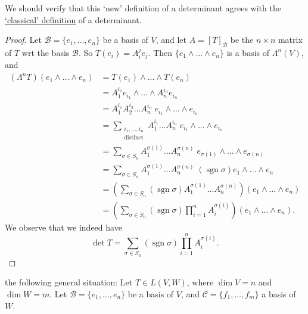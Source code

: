 \documentclass[notoc,notitlepage]{tufte-book}
\DeclareMathOperator{\sgn}{sgn}
\begin{document}
\begin{note}
  We should verify that this `new' definition of a determinant agrees with the
  \href{https://en.wikipedia.org/wiki/Determinant\#n_\%C3\%97_n_matrices}{`classical' definition}
  of a determinant.
\end{note}

\begin{proof}
  Let $\mathcal{B} = \{ e_1, \ldots, e_n \}$ be a basis of $V$, and let
  $A = [T]_{\mathcal{B}}$ be the $n \times n$ matrix of $T$ wrt the basis
  $\mathcal{B}$. So $T(e_i) = A_i^j e_j$. Then $\{ e_1 \land \hdots \land e_n \}$
  is a basis of $\Lambda^n(V)$, and
  \begin{align*}
    \left( \Lambda^n T \right)(e_1 \land \hdots \land e_n)
    &= T(e_1) \land \hdots \land T(e_n) \\
    &= A_1^{i_1} e_{i_1} \land \hdots \land A_n^{i_n} e_{i_n} \\
    &= A_1^{i_1} A_2^{i_2} \hdots A_n^{i_n} \; e_{i_1} \land \hdots \land e_{i_n} \\
    &= \sum_{\substack{i_1, \ldots, i_n \\ \text{distinct}}} A_1^{i_1} \hdots A_n^{i_n} \;
      e_{i_1} \land \hdots \land e_{i_n} \\
    &= \sum_{\sigma \in S_n} A_1^{\sigma(1)} \hdots A_n^{\sigma(n)} \;
      e_{\sigma(1)} \land \hdots \land e_{\sigma(n)} \\
    &= \sum_{\sigma \in S_n} A_1^{\sigma(1)} \hdots A_n^{\sigma(n)} \;
      (\sgn \sigma) e_1 \land \hdots \land e_n \\
    &= \left( \sum_{\sigma \in S_n} (\sgn \sigma) A_1^{\sigma(1)} \hdots A_n^{\sigma(n)} \right)
      \left( e_1 \land \hdots \land e_n \right) \\
    &= \left( \sum_{\sigma \in S_n} (\sgn \sigma) \prod_{i = 1}^{n} A_i^{\sigma(i)} \right)
      \left( e_1 \land \hdots \land e_n \right).
  \end{align*}
  We observe that we indeed have
  \begin{equation*}
    \det T = \sum_{\sigma \in S_n} (\sgn \sigma) \prod_{i = 1}^{n} A_i^{\sigma(i)}.
  \end{equation*}
\end{proof}

 the following general situation: Let $T \in L(V, W)$,
where $\dim V = n$ and $\dim W = m$. Let $\mathcal{B} = \{ e_1, \ldots, e_n \}$
be a basis of $V$, and $\mathcal{C} = \{ f_1, \ldots, f_m \}$ a basis of $W$.
\end{document}
